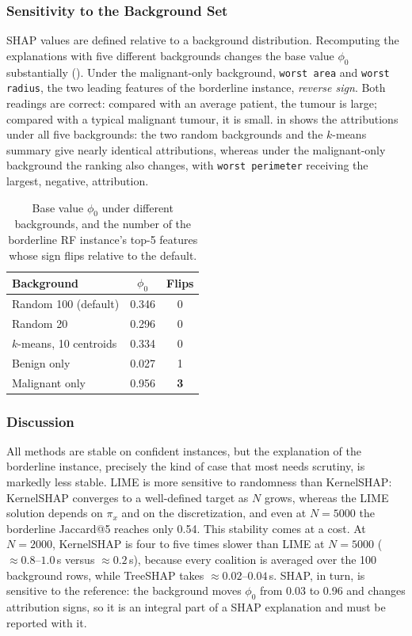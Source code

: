 \subsubsection{Sensitivity to the Background Set}
SHAP values are defined relative to a background distribution. Recomputing the explanations with five different backgrounds changes the base value $\phi_0$ substantially (). Under the malignant-only background, \texttt{worst area} and \texttt{worst radius}, the two leading features of the borderline instance, \textit{reverse sign}. Both readings are correct: compared with an average patient, the tumour is large; compared with a typical malignant tumour, it is small.  in  shows the attributions under all five backgrounds: the two random backgrounds and the $k$-means summary give nearly identical attributions, whereas under the malignant-only background the ranking also changes, with \texttt{worst perimeter} receiving the largest, negative, attribution.

\begin{table}[htbp]
    \centering
    \footnotesize
    \caption{Base value $\phi_0$ under different backgrounds, and the number of the borderline RF instance's top-5 features whose sign flips relative to the default.}
    \label{tab:background}
    \begin{tabular}{@{}lcc@{}}
        \toprule
        Background & $\phi_0$ & Flips \\
        \midrule
        Random 100 (default) & 0.346 & 0 \\
        Random 20 & 0.296 & 0 \\
        $k$-means, 10 centroids & 0.334 & 0 \\
        Benign only & 0.027 & 1 \\
        Malignant only & 0.956 & \textbf{3} \\
        \bottomrule
    \end{tabular}
\end{table}

\subsubsection{Discussion}
All methods are stable on confident instances, but the explanation of the borderline instance, precisely the kind of case that most needs scrutiny, is markedly less stable. LIME is more sensitive to randomness than KernelSHAP: KernelSHAP converges to a well-defined target as $N$ grows, whereas the LIME solution depends on $\pi_x$ and on the discretization, and even at $N = 5000$ the borderline Jaccard@5 reaches only 0.54. This stability comes at a cost. At $N = 2000$, KernelSHAP is four to five times slower than LIME at $N = 5000$ ($\approx 0.8$--$1.0$\,s versus $\approx 0.2$\,s), because every coalition is averaged over the 100 background rows, while TreeSHAP takes $\approx 0.02$--$0.04$\,s. SHAP, in turn, is sensitive to the reference: the background moves $\phi_0$ from 0.03 to 0.96 and changes attribution signs, so it is an integral part of a SHAP explanation and must be reported with it.

